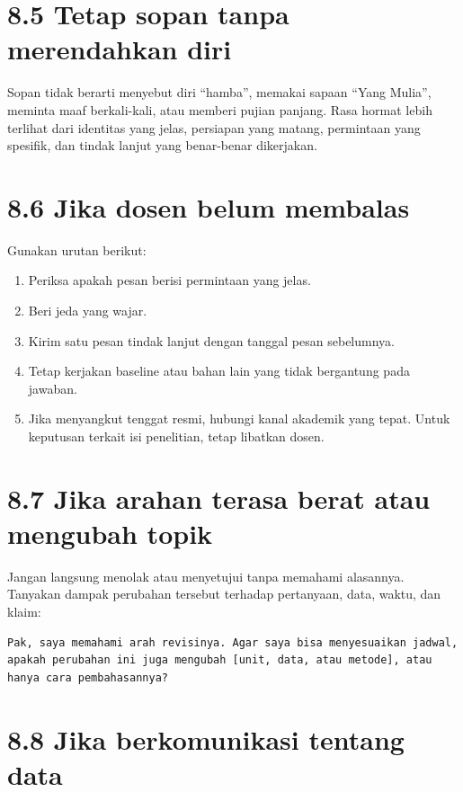 \documentclass[
  indonesian,
]{article}
\providecommand{\tightlist}{%
  \setlength{\itemsep}{0pt}\setlength{\parskip}{0pt}}
\renewcommand{\subsection}{\section}
\begin{document}
\subsection{8.5 Tetap sopan tanpa merendahkan
diri}\label{tetap-sopan-tanpa-merendahkan-diri}

Sopan tidak berarti menyebut diri ``hamba'', memakai sapaan ``Yang
Mulia'', meminta maaf berkali-kali, atau memberi pujian panjang. Rasa
hormat lebih terlihat dari identitas yang jelas, persiapan yang matang,
permintaan yang spesifik, dan tindak lanjut yang benar-benar dikerjakan.

\subsection{8.6 Jika dosen belum
membalas}\label{jika-dosen-belum-membalas}

Gunakan urutan berikut:

\begin{enumerate}
\def\labelenumi{\arabic{enumi}.}
\tightlist
\item
  Periksa apakah pesan berisi permintaan yang jelas.
\item
  Beri jeda yang wajar.
\item
  Kirim satu pesan tindak lanjut dengan tanggal pesan sebelumnya.
\item
  Tetap kerjakan baseline atau bahan lain yang tidak bergantung pada
  jawaban.
\item
  Jika menyangkut tenggat resmi, hubungi kanal akademik yang tepat.
  Untuk keputusan terkait isi penelitian, tetap libatkan dosen.
\end{enumerate}

\subsection{8.7 Jika arahan terasa berat atau mengubah
topik}\label{jika-arahan-terasa-berat-atau-mengubah-topik}

Jangan langsung menolak atau menyetujui tanpa memahami alasannya.
Tanyakan dampak perubahan tersebut terhadap pertanyaan, data, waktu, dan
klaim:

\begin{verbatim}
Pak, saya memahami arah revisinya. Agar saya bisa menyesuaikan jadwal, apakah perubahan ini juga mengubah [unit, data, atau metode], atau hanya cara pembahasannya?
\end{verbatim}

\subsection{8.8 Jika berkomunikasi tentang
data}\label{jika-berkomunikasi-tentang-data}
\end{document}
